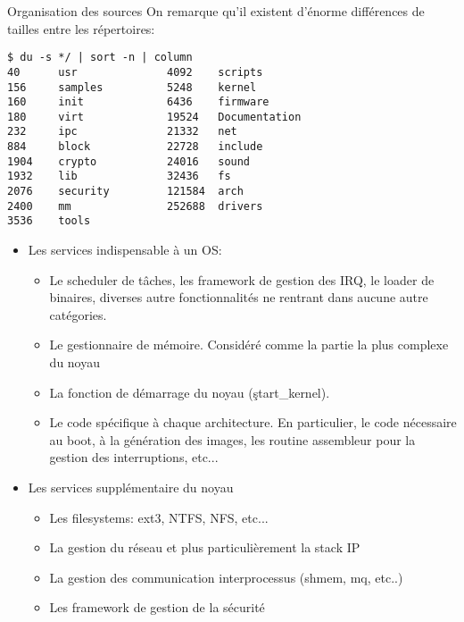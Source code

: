 \begin{frame}[fragile=singleslide]{Organisation des sources}
  On remarque qu'il existent d'énorme différences de tailles entre les
  répertoires:
  \begin{lstlisting}
$ du -s */ | sort -n | column
40      usr              4092    scripts
156     samples          5248    kernel
160     init             6436    firmware
180     virt             19524   Documentation
232     ipc              21332   net
884     block            22728   include
1904    crypto           24016   sound
1932    lib              32436   fs
2076    security         121584  arch
2400    mm               252688  drivers
3536    tools
  \end{lstlisting} 
  \begin{itemize} 
  \item Les services indispensable à un OS:
    \begin{itemize} 
    \item  {}  Le scheduler  de  tâches,  les framework  de
      gestion  des   IRQ,  le  loader  de   binaires,  diverses  autre
      fonctionnalités ne rentrant dans aucune autre catégories.
    \item  {} Le  gestionnaire de  mémoire. Considéré  comme la
      partie la plus complexe du noyau
    \item   {}   La    fonction   de   démarrage   du   noyau
      (\c{start_kernel}).
    \item  {} Le  code spécifique  à chaque  architecture. En
      particulier,  le code nécessaire  au boot,  à la  génération des
      images,   les   routine   assembleur   pour   la   gestion   des
      interruptions, etc...
    \end{itemize} 
  \item Les services supplémentaire du noyau
    \begin{itemize}
    \item {} Les filesystems: ext3, NTFS, NFS, etc...
    \item {} La gestion  du réseau et plus particulièrement la
      stack IP
    \item  {}  La  gestion  des  communication  interprocessus
      (shmem, mq, etc..)
    \item  {} Les  framework  de gestion  de la  sécurité

\end{itemize}
\end{itemize}
\end{frame}

